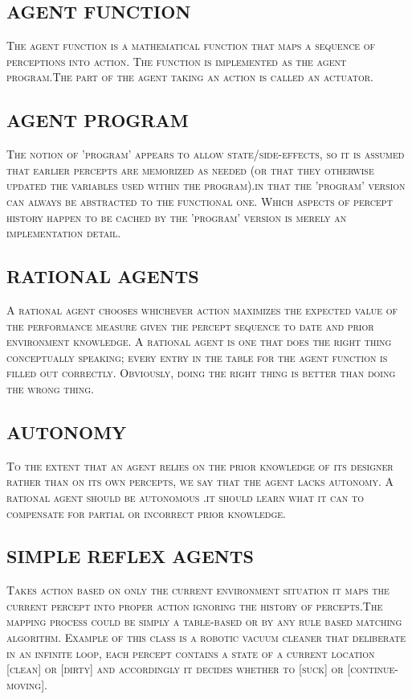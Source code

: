 \documentclass[12pt]{article}
\begin{document}
\subsection{AGENT FUNCTION}
\textsc{\Small The agent function is a mathematical function that maps a
sequence of perceptions into action. The function is implemented as the agent program.The part of the agent taking an action is called an actuator.}

\subsection{AGENT PROGRAM}
\textsc{\Small The notion of 'program' appears to allow state/side-effects,
so it is assumed that earlier percepts are memorized as needed (or that they otherwise updated the variables used within the program).in that the 'program' version can always be abstracted to the functional one. Which aspects of percept history happen to be cached by the 'program' version is merely an implementation detail.}
\pagebreak

\subsection{RATIONAL AGENTS}
\textsc{\Small A rational agent chooses whichever action maximizes the
expected value of the performance measure given the percept sequence to date and prior environment knowledge. A rational agent is one that does the right thing conceptually speaking; every entry in the table for the agent function is filled out correctly. Obviously, doing the right thing is better than doing the wrong thing.}
\subsection{AUTONOMY}
\textsc{\Small To the extent that an agent relies on the prior knowledge of its
designer rather than on its own percepts, we say that the agent lacks autonomy. A rational agent should be autonomous .it should learn what it can to compensate for partial or incorrect prior knowledge.}
\subsection{SIMPLE REFLEX AGENTS}
\textsc{\Small Takes action based on only the current environment
situation it maps the current percept into proper action ignoring the history of percepts.The mapping process could be simply a table-based or by any rule based matching algorithm. Example of this class is a robotic vacuum cleaner that deliberate in an infinite loop, each percept contains a state of a current location [clean] or [dirty] and accordingly it decides whether to [suck] or [continue-moving].}
\end{document}
